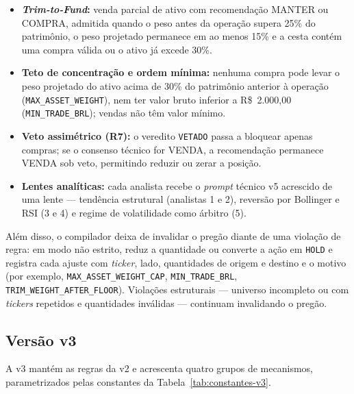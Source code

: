 \begin{itemize}
  \item \textbf{\textit{Trim-to-Fund}:} venda parcial de ativo com recomendação MANTER ou COMPRA, admitida quando o peso antes da operação supera 25\% do patrimônio, o peso projetado permanece em ao menos 15\% e a cesta contém uma compra válida ou o ativo já excede 30\%.
  \item \textbf{Teto de concentração e ordem mínima:} nenhuma compra pode levar o peso projetado do ativo acima de 30\% do patrimônio anterior à operação (\texttt{MAX\_ASSET\_WEIGHT}), nem ter valor bruto inferior a R\$~2.000,00 (\texttt{MIN\_TRADE\_BRL}); vendas não têm valor mínimo.
  \item \textbf{Veto assimétrico (R7):} o veredito \texttt{VETADO} passa a bloquear apenas compras; se o consenso técnico for VENDA, a recomendação permanece VENDA sob veto, permitindo reduzir ou zerar a posição.
  \item \textbf{Lentes analíticas:} cada analista recebe o \textit{prompt} técnico v5 acrescido de uma lente --- tendência estrutural (analistas 1 e 2), reversão por Bollinger e RSI (3 e 4) e regime de volatilidade como árbitro (5).
\end{itemize}

Além disso, o compilador deixa de invalidar o pregão diante de uma violação de regra: em modo não estrito, reduz a quantidade ou converte a ação em \texttt{HOLD} e registra cada ajuste com \textit{ticker}, lado, quantidades de origem e destino e o motivo (por exemplo, \texttt{MAX\_ASSET\_WEIGHT\_CAP}, \texttt{MIN\_TRADE\_BRL}, \texttt{TRIM\_WEIGHT\_AFTER\_FLOOR}). Violações estruturais --- universo incompleto ou com \textit{tickers} repetidos e quantidades inválidas --- continuam invalidando o pregão.

\subsection{Versão v3}

A v3 mantém as regras da v2 e acrescenta quatro grupos de mecanismos, parametrizados pelas constantes da Tabela~\ref{tab:constantes-v3}.

